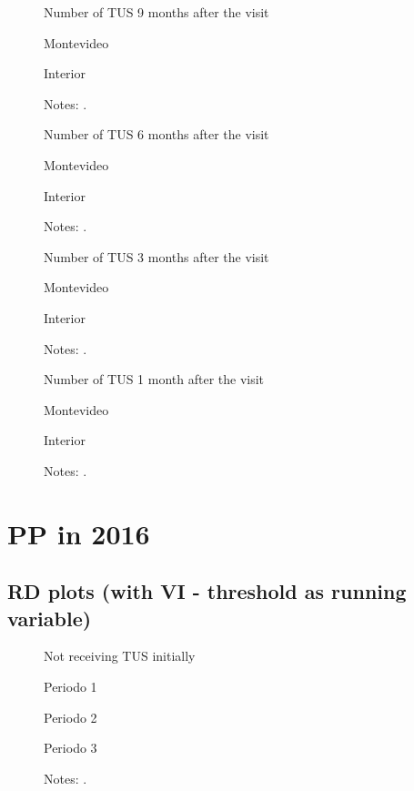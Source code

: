 \documentclass[12pt]{article}
\begin{document}
\begin{figure}[H]%
	\caption{Number of TUS 9 months after the visit}%
	\centering
	\caption*{ {Montevideo}}
	\qquad
	\caption*{Interior}
	\label{fig:first_stage_2018_tus9}%
	\caption*{ {\footnotesize Notes: .}}
\end{figure}

\begin{figure}[H]%
	\caption{Number of TUS 6 months after the visit}%
	\centering
	\caption*{ {Montevideo}}
	\qquad
	\caption*{Interior}
	\label{fig:first_stage_2018_tus6}%
	\caption*{ {\footnotesize Notes: .}}
\end{figure}

\begin{figure}[H]%
	\caption{Number of TUS 3 months after the visit}%
	\centering
	\caption*{ {Montevideo}}
	\qquad
	\caption*{Interior}
	\label{fig:first_stage_2018_tus3}%
	\caption*{ {\footnotesize Notes: .}}
\end{figure}

\begin{figure}[H]%
	\caption{Number of TUS 1 month after the visit}%
	\centering
	\caption*{ {Montevideo}}
	\qquad
	\caption*{Interior}
	\label{fig:first_stage_2018_tus1}%
	\caption*{ {\footnotesize Notes: .}}
\end{figure}

\section{PP in 2016}

\subsection{RD plots (with VI - threshold as running variable)}
\begin{figure}[H]%
	\caption{Not receiving TUS initially}%
	\centering
	\caption*{ {Periodo 1}}
	\caption*{Periodo 2}
	\qquad
	\caption*{Periodo 3}
	\label{fig:pp2016_prim_0TUS.png}%
	\caption*{ {\footnotesize Notes: .}}
\end{figure}
\end{document}
